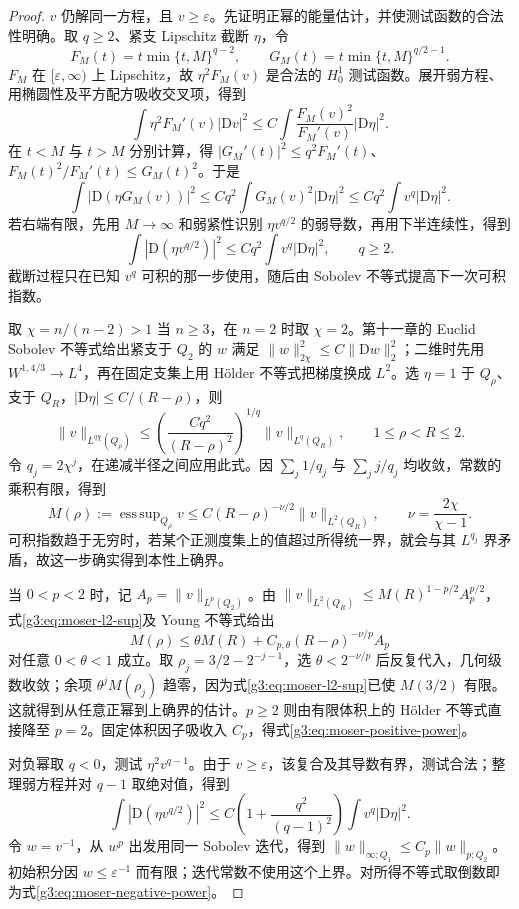 \begin{proof}
	\(v\) 仍解同一方程，且 \(v\ge\varepsilon\)。先证明正幂的能量估计，并使测试函数的合法性明确。取 \(q\ge2\)、紧支 Lipschitz 截断 \(\eta\)，令
	\[
		F_M(t)=t\min\{t,M\}^{q-2},\qquad
		G_M(t)=t\min\{t,M\}^{q/2-1}.
	\]
	\(F_M\) 在 \([\varepsilon,\infty)\) 上 Lipschitz，故 \(\eta^2F_M(v)\) 是合法的 \(H_0^1\) 测试函数。展开弱方程、用椭圆性及平方配方吸收交叉项，得到
	\[
		\int\eta^2F_M'(v)|\mathrm Dv|^2
		\le C\int\frac{F_M(v)^2}{F_M'(v)}|\mathrm D\eta|^2.
	\]
	在 \(t<M\) 与 \(t>M\) 分别计算，得
	\(|G_M'(t)|^2\le q^2 F_M'(t)\)、\(F_M(t)^2/F_M'(t)\le G_M(t)^2\)。于是
	\[
		\int|\mathrm D(\eta G_M(v))|^2
		\le Cq^2\int G_M(v)^2|\mathrm D\eta|^2
		\le Cq^2\int v^q|\mathrm D\eta|^2.
	\]
	若右端有限，先用 \(M\to\infty\) 和弱紧性识别 \(\eta v^{q/2}\) 的弱导数，再用下半连续性，得到
	\begin{equation}\label{g3:eq:moser-power-energy}
		\int|\mathrm D(\eta v^{q/2})|^2
		\le Cq^2\int v^q|\mathrm D\eta|^2,\qquad q\ge2.
	\end{equation}
	截断过程只在已知 \(v^q\) 可积的那一步使用，随后由 Sobolev 不等式提高下一次可积指数。

	取 \(\chi=n/(n-2)>1\) 当 \(n\ge3\)，在 \(n=2\) 时取 \(\chi=2\)。第十一章的 Euclid Sobolev 不等式给出紧支于 \(Q_2\) 的 \(w\) 满足 \(\|w\|_{2\chi}^2\le C\|\mathrm Dw\|_2^2\)；二维时先用 \(W^{1,4/3}\to L^4\)，再在固定支集上用 Hölder 不等式把梯度换成 \(L^2\)。选 \(\eta=1\) 于 \(Q_\rho\)、支于 \(Q_R\)，\(|\mathrm D\eta|\le C/(R-\rho)\)，则
	\[
		\|v\|_{L^{q\chi}(Q_\rho)}
		\le\left(\frac{Cq^2}{(R-\rho)^2}\right)^{1/q}
		\|v\|_{L^q(Q_R)},\qquad1\le\rho<R\le2.
	\]
	令 \(q_j=2\chi^j\)，在递减半径之间应用此式。因 \(\sum_j1/q_j\) 与 \(\sum_jj/q_j\) 均收敛，常数的乘积有限，得到
	\begin{equation}\label{g3:eq:moser-l2-sup}
		M(\rho):=\mathop{\mathrm{ess\,sup}}_{Q_\rho}v
		\le C(R-\rho)^{-\nu/2}\|v\|_{L^2(Q_R)},
		\qquad \nu=\frac{2\chi}{\chi-1}.
	\end{equation}
	可积指数趋于无穷时，若某个正测度集上的值超过所得统一界，就会与其 \(L^{q_j}\) 界矛盾，故这一步确实得到本性上确界。

	当 \(0<p<2\) 时，记 \(A_p=\|v\|_{L^p(Q_2)}\)。由
	\(\|v\|_{L^2(Q_R)}\le M(R)^{1-p/2}A_p^{p/2}\)，式\eqref{g3:eq:moser-l2-sup}及 Young 不等式给出
	\[
		M(\rho)\le\theta M(R)+C_{p,\theta}(R-\rho)^{-\nu/p}A_p
	\]
	对任意 \(0<\theta<1\) 成立。取 \(\rho_j=3/2-2^{-j-1}\)，选 \(\theta<2^{-\nu/p}\) 后反复代入，几何级数收敛；余项 \(\theta^jM(\rho_j)\) 趋零，因为式\eqref{g3:eq:moser-l2-sup}已使 \(M(3/2)\) 有限。这就得到从任意正幂到上确界的估计。\(p\ge2\) 则由有限体积上的 Hölder 不等式直接降至 \(p=2\)。固定体积因子吸收入 \(C_p\)，得式\eqref{g3:eq:moser-positive-power}。

	对负幂取 \(q<0\)，测试 \(\eta^2v^{q-1}\)。由于 \(v\ge\varepsilon\)，该复合及其导数有界，测试合法；整理弱方程并对 \(q-1\) 取绝对值，得到
	\[
		\int|\mathrm D(\eta v^{q/2})|^2
		\le C\left(1+\frac{q^2}{(q-1)^2}\right)
		\int v^q|\mathrm D\eta|^2.
	\]
	令 \(w=v^{-1}\)，从 \(w^p\) 出发用同一 Sobolev 迭代，得到 \(\|w\|_{\infty;Q_1}\le C_p\|w\|_{p;Q_2}\)。初始积分因 \(w\le\varepsilon^{-1}\) 而有限；迭代常数不使用这个上界。对所得不等式取倒数即为式\eqref{g3:eq:moser-negative-power}。
\end{proof}

